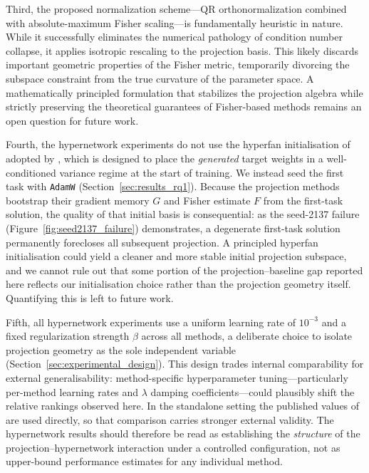 Third, the proposed normalization scheme---QR orthonormalization combined with
absolute-maximum Fisher scaling---is fundamentally heuristic in nature.
While it successfully eliminates the numerical pathology of condition number collapse,
it applies isotropic rescaling to the projection basis.
This likely discards important geometric properties of the Fisher metric, temporarily divorcing the
subspace constraint from the true curvature of the parameter space.
A mathematically principled formulation that stabilizes the projection algebra
while strictly preserving the theoretical guarantees of Fisher-based methods
remains an open question for future work.

Fourth, the hypernetwork experiments do not use the hyperfan initialisation
of \citet{chang_principled_2020} adopted by \citet{oswald_continual_2020},
which is designed to place the \emph{generated} target weights in a
well-conditioned variance regime at the start of training. We instead seed
the first task with \texttt{AdamW} (Section~\ref{sec:results_rq1}). Because
the projection methods bootstrap their gradient memory $G$ and Fisher
estimate $F$ from the first-task solution, the quality of that initial basis
is consequential: as the seed-2137 failure
(Figure~\ref{fig:seed2137_failure}) demonstrates, a degenerate first-task
solution permanently forecloses all subsequent projection. A principled
hyperfan initialisation could yield a cleaner and more stable initial
projection subspace, and we cannot rule out that some portion of the
projection--baseline gap reported here reflects our initialisation choice
rather than the projection geometry itself. Quantifying this is left to
future work.

Fifth, all hypernetwork experiments use a uniform learning rate of $10^{-3}$
and a fixed regularization strength $\beta$ across all methods, a deliberate
choice to isolate projection geometry as the sole independent variable
(Section~\ref{sec:experimental_design}).
This design trades internal comparability for external generalisability:
method-specific hyperparameter tuning---particularly per-method learning
rates and $\lambda$ damping coefficients---could plausibly shift the
relative rankings observed here.
In the standalone setting the published values of
\citet{garg_fisher-orthogonal_2026} are used directly, so that comparison
carries stronger external validity.
The hypernetwork results should therefore be read as establishing the
\emph{structure} of the projection--hypernetwork interaction under a
controlled configuration, not as upper-bound performance estimates for any
individual method.

